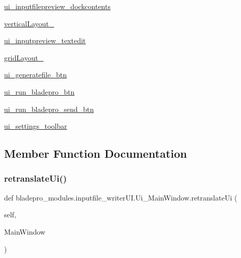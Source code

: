 \begin{DoxyCompactItemize}
\item 
\hyperlink{classbladepro__modules_1_1inputfile__writer_u_i_1_1_ui___main_window_a0a9b9095e43dff8b0591f5c99ed096b8}{ui\+\_\+inputfilepreview\+\_\+dockcontents}
\item 
\hyperlink{classbladepro__modules_1_1inputfile__writer_u_i_1_1_ui___main_window_af6dda5301b2c18cc6cb517d406371cd8}{vertical\+Layout\+\_}
\item 
\hyperlink{classbladepro__modules_1_1inputfile__writer_u_i_1_1_ui___main_window_a0a84b37e3d14b098f01ea8245886422b}{ui\+\_\+inputpreview\+\_\+textedit}
\item 
\hyperlink{classbladepro__modules_1_1inputfile__writer_u_i_1_1_ui___main_window_a1165976bce8597d5c2b05749090db4bb}{grid\+Layout\+\_}
\item 
\hyperlink{classbladepro__modules_1_1inputfile__writer_u_i_1_1_ui___main_window_aebd557fcfd5421d6699c90c70a00964a}{ui\+\_\+generatefile\+\_\+btn}
\item 
\hyperlink{classbladepro__modules_1_1inputfile__writer_u_i_1_1_ui___main_window_a0cf12a13035007f59d8f7d6412303347}{ui\+\_\+run\+\_\+bladepro\+\_\+btn}
\item 
\hyperlink{classbladepro__modules_1_1inputfile__writer_u_i_1_1_ui___main_window_a0138512db7f881556de8ed89ee615c76}{ui\+\_\+run\+\_\+bladepro\+\_\+send\+\_\+btn}
\item 
\hyperlink{classbladepro__modules_1_1inputfile__writer_u_i_1_1_ui___main_window_a4610a54fb1790404af1664e4aa5d5883}{ui\+\_\+settings\+\_\+toolbar}
\end{DoxyCompactItemize}


\subsection{Member Function Documentation}
\hypertarget{classbladepro__modules_1_1inputfile__writer_u_i_1_1_ui___main_window_a640f34d5228b66fcf4118eaa17edf8d6}{}\label{classbladepro__modules_1_1inputfile__writer_u_i_1_1_ui___main_window_a640f34d5228b66fcf4118eaa17edf8d6} 
\subsubsection{\texorpdfstring{retranslate\+Ui()}{retranslateUi()}}
{\footnotesize\ttfamily def bladepro\+\_\+modules.\+inputfile\+\_\+writer\+U\+I.\+Ui\+\_\+\+Main\+Window.\+retranslate\+Ui (\begin{DoxyParamCaption}\item[{}]{self,  }\item[{}]{Main\+Window }\end{DoxyParamCaption})}

